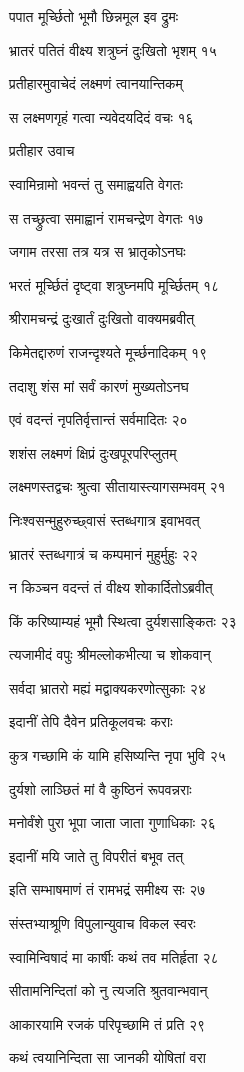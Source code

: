 पपात मूर्च्छितो भूमौ छिन्नमूल इव द्रुमः

भ्रातरं पतितं वीक्ष्य शत्रुघ्नं दुःखितो भृशम् १५

प्रतीहारमुवाचेदं लक्ष्मणं त्वानयान्तिकम्

स लक्ष्मणगृहं गत्वा न्यवेदयदिदं वचः १६

प्रतीहार उवाच

स्वामिन्रामो भवन्तं तु समाह्वयति वेगतः

स तच्छ्रुत्वा समाह्वानं रामचन्द्रेण वेगतः १७

जगाम तरसा तत्र यत्र स भ्रातृकोऽनघः

भरतं मूर्च्छितं दृष्ट्वा शत्रुघ्नमपि मूर्च्छितम् १८

श्रीरामचन्द्रं दुःखार्तं दुःखितो वाक्यमब्रवीत्

किमेतद्दारुणं राजन्दृश्यते मूर्च्छनादिकम् १९

तदाशु शंस मां सर्वं कारणं मुख्यतोऽनघ

एवं वदन्तं नृपतिर्वृत्तान्तं सर्वमादितः २०

शशंस लक्ष्मणं क्षिप्रं दुःखपूरपरिप्लुतम्

लक्ष्मणस्तद्वचः श्रुत्वा सीतायास्त्यागसम्भवम् २१

निःश्वसन्मुहुरुच्छ्वासं स्तब्धगात्र इवाभवत्

भ्रातरं स्तब्धगात्रं च कम्पमानं मुहुर्मुहुः २२

न किञ्चन वदन्तं तं वीक्ष्य शोकार्दितोऽब्रवीत्

किं करिष्याम्यहं भूमौ स्थित्वा दुर्यशसाङ्कितः २३

त्यजामीदं वपुः श्रीमल्लोकभीत्या च शोकवान्

सर्वदा भ्रातरो मह्यं मद्वाक्यकरणोत्सुकाः २४

इदानीं तेपि दैवेन प्रतिकूलवचः कराः

कुत्र गच्छामि कं यामि हसिष्यन्ति नृपा भुवि २५

दुर्यशो लाञ्छितं मां वै कुष्ठिनं रूपवन्नराः

मनोर्वंशे पुरा भूपा जाता जाता गुणाधिकाः २६

इदानीं मयि जाते तु विपरीतं बभूव तत्

इति सम्भाषमाणं तं रामभद्रं समीक्ष्य सः २७

संस्तभ्याश्रूणि विपुलान्युवाच विकल स्वरः

स्वामिन्विषादं मा कार्षीः कथं तव मतिर्हृता २८

सीतामनिन्दितां को नु त्यजति श्रुतवान्भवान्

आकारयामि रजकं परिपृच्छामि तं प्रति २९

कथं त्वयानिन्दिता सा जानकी योषितां वरा

